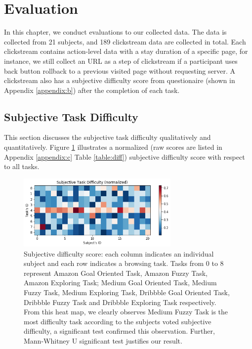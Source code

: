 \section{Evaluation}
\label{ch:eval}

In this chapter, we conduct evaluations to our collected data.
The data is collected from 21 subjects, and 189 clickstream data are collected in total. 
Each clickstream contains action-level data with a stay duration
of a specific page, for instance, we still collect an URL as a step of clickstream 
if a participant uses back button rollback to a previous visited page without requesting server. 
A clickstream also has a subjective difficulty score from questionaire (shown in Appendix \ref{appendix:b}) 
after the completion of each task.

\subsection{Subjective Task Difficulty}

This section discusses the subjective task difficulty qualitatively and quantitatively.
Figure \ref{fig:difficulty} illustrates a normalized (raw scores are listed in 
Appendix \ref{appendix:c} Table \ref{table:diff}) subjective difficulty score 
with respect to all tasks.

\begin{figure}[H]
    \centering
    \includegraphics[width=0.7\textwidth]{figures/difficulty}
    \caption{Subjective difficulty score: each column indicates an individual subject and
    each row indicates a browsing task. Tasks from 0 to 8 represent Amazon Goal Oriented Task,
    Amazon Fuzzy Task, Amazon Exploring Task; Medium Goal Oriented Task, Medium Fuzzy Task,
    Medium Exploring Task, Dribbble Goal Oriented Task, Dribbble Fuzzy Task and Dribbble Exploring Task
    respectively.
    From this heat map, we clearly observes Medium Fuzzy Task is the most difficulty task
    according to the subjects voted subjective difficulty, a significant test confirmed this observation.
    Further, Mann-Whitney U significant test justifies our result.}
    \label{fig:difficulty}
\end{figure}

